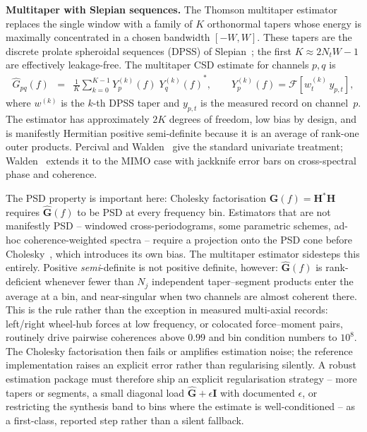 \documentclass[10pt,a4paper]{article}
\numberwithin{equation}{section}
\newcommand{\block}[1]{\left[#1\right]}
\newcommand{\mat}[1]{\left(#1\right)}
\begin{document}
\textbf{Multitaper with Slepian sequences.} The Thomson multitaper estimator~\cite{thomson1982multitaper} replaces the single window with a family of $K$ orthonormal tapers whose energy is maximally concentrated in a chosen bandwidth $\block{-W, W}$. These tapers are the discrete prolate spheroidal sequences (DPSS) of Slepian~\cite{slepian1978dpss}; the first $K \approx 2 N_t W - 1$ are effectively leakage-free. The multitaper CSD estimate for channels $p,q$ is
\begin{eqnarray}
\hat G_{p q}\mat{f} &=& \frac{1}{K}\sum_{k=0}^{K-1} Y^{(k)}_{p}\mat{f}\; {Y^{(k)}_{q}\mat{f}}^*, \qquad Y^{(k)}_{p}\mat{f} = \mathcal{F}\block{w^{(k)}_t\, y_{p, t}},
\end{eqnarray}
where $w^{(k)}$ is the $k$-th DPSS taper and $y_{p, t}$ is the measured record on channel~$p$. The estimator has approximately $2K$ degrees of freedom, low bias by design, and is manifestly Hermitian positive semi-definite because it is an average of rank-one outer products. Percival and Walden~\cite{percival_walden_1993} give the standard univariate treatment; Walden~\cite{walden2000multivariate} extends it to the MIMO case with jackknife error bars on cross-spectral phase and coherence.

The PSD property is important here: Cholesky factorisation $\mathbf{G}\mat{f} = \mathbf{H}^*\mathbf{H}$ requires $\hat{\mathbf{G}}\mat{f}$ to be PSD at every frequency bin. Estimators that are not manifestly PSD -- windowed cross-periodograms, some parametric schemes, ad-hoc coherence-weighted spectra -- require a projection onto the PSD cone before Cholesky~\cite{higham1988nearest}, which introduces its own bias. The multitaper estimator sidesteps this entirely. Positive \emph{semi}-definite is not positive definite, however: $\hat{\mathbf{G}}\mat{f}$ is rank-deficient whenever fewer than $N_j$ independent taper--segment products enter the average at a bin, and near-singular when two channels are almost coherent there. This is the rule rather than the exception in measured multi-axial records: left/right wheel-hub forces at low frequency, or colocated force--moment pairs, routinely drive pairwise coherences above $0.99$ and bin condition numbers to $10^8$. The Cholesky factorisation then fails or amplifies estimation noise; the reference implementation raises an explicit error rather than regularising silently. A robust estimation package must therefore ship an explicit regularisation strategy -- more tapers or segments, a small diagonal load $\hat{\mathbf{G}} + \epsilon\mathbf{I}$ with documented $\epsilon$, or restricting the synthesis band to bins where the estimate is well-conditioned -- as a first-class, reported step rather than a silent fallback.
\end{document}
